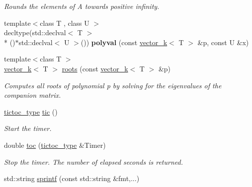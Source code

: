 \begin{DoxyCompactItemize}
\begin{DoxyCompactList}\small\item\em Rounds the elements of A towards positive infinity. \end{DoxyCompactList}\item 
\hypertarget{namespacekeycpp_ae7de6c3e5c495e91b1b1de7d716e7a5d}{{\footnotesize template$<$class T , class U $>$ }\\decltype(std\-::declval$<$ T $>$\\*
()$\ast$std\-::declval$<$ U $>$()) {\bfseries polyval} (const \hyperlink{classkeycpp_1_1vector__k}{vector\-\_\-k}$<$ T $>$ \&p, const U \&x)}\label{namespacekeycpp_ae7de6c3e5c495e91b1b1de7d716e7a5d}

\item 
\hypertarget{namespacekeycpp_a21cb545ca871d88bcd449b61bd8bdbfb}{{\footnotesize template$<$class T $>$ }\\\hyperlink{classkeycpp_1_1vector__k}{vector\-\_\-k}$<$ T $>$ \hyperlink{namespacekeycpp_a21cb545ca871d88bcd449b61bd8bdbfb}{roots} (const \hyperlink{classkeycpp_1_1vector__k}{vector\-\_\-k}$<$ T $>$ \&p)}\label{namespacekeycpp_a21cb545ca871d88bcd449b61bd8bdbfb}

\begin{DoxyCompactList}\small\item\em Computes all roots of polynomial p by solving for the eigenvalues of the companion matrix. \end{DoxyCompactList}\item 
\hypertarget{namespacekeycpp_a6069a9eec0edfa1d401230013d98765e}{\hyperlink{structkeycpp_1_1tictoc__type}{tictoc\-\_\-type} \hyperlink{namespacekeycpp_a6069a9eec0edfa1d401230013d98765e}{tic} ()}\label{namespacekeycpp_a6069a9eec0edfa1d401230013d98765e}

\begin{DoxyCompactList}\small\item\em Start the timer. \end{DoxyCompactList}\item 
\hypertarget{namespacekeycpp_afe03fbbb5126729fb4b9367097acb1d1}{double \hyperlink{namespacekeycpp_afe03fbbb5126729fb4b9367097acb1d1}{toc} (\hyperlink{structkeycpp_1_1tictoc__type}{tictoc\-\_\-type} \&Timer)}\label{namespacekeycpp_afe03fbbb5126729fb4b9367097acb1d1}

\begin{DoxyCompactList}\small\item\em Stop the timer. The number of elapsed seconds is returned. \end{DoxyCompactList}\item 
\hypertarget{namespacekeycpp_a9d70a761d33bbc2bdec6b4e0eb43d517}{std\-::string \hyperlink{namespacekeycpp_a9d70a761d33bbc2bdec6b4e0eb43d517}{sprintf} (const std\-::string \&fmt,...)}\label{namespacekeycpp_a9d70a761d33bbc2bdec6b4e0eb43d517}


\end{DoxyCompactItemize}
